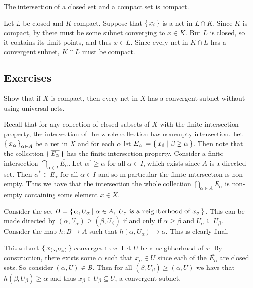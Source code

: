 \documentclass[letterpaper, 11pt, oneside]{book}
\begin{document}
\begin{prop}\label{prop: closed_cap_compact_is_compact}
  The intersection of a closed set and a compact set is compact.
\end{prop}
\begin{pf}
  Let $L$ be closed and $K$ compact.
  Suppose that $\set{x_{i}}$ is a net in $L \cap K$.
  Since $K$ is compact, by  there must be some subnet converging to $x \in K$.
  But $L$ is closed, so it contains its limit points, and thus $x \in L$.
  Since every net in $K \cap L$ has a convergent subnet, $K \cap L$ must be compact.
\end{pf}

\clearpage

\subsection*{Exercises}

\begin{exercise}
  Show that if $X$ is compact, then every net in $X$ has a convergent subnet without using universal nets.
\end{exercise}
\begin{pf}
  Recall that for any collection of closed subsets of $X$ with the finite intersection property, the intersection of the whole collection has nonempty intersection.
  Let $\set{x_{\alpha}}_{\alpha \in A}$ be a net in $X$ and for each $\alpha$ let $E_{\alpha} \coloneqq \set{x_{\beta} | \beta \geq \alpha}$.
  Then note that the collection $\set{\overline{E_{\alpha}}}$ has the finite intersection property.
  Consider a finite intersection $\bigcap_{\alpha \in I} \overline{E_{\alpha}}$.
  Let $\alpha^{*} \geq \alpha$ for all $\alpha \in I$, which exists since $A$ is a directed set.
  Then $\alpha^{*} \in \overline{E_{\alpha}}$ for all $\alpha \in I$ and so in particular the finite intersection is non-empty.
  Thus we have that the intersection the whole collection $\bigcap_{\alpha \in A} \overline{E_{\alpha}}$ is non-empty containing some element $x \in X$.

  Consider the set $B = \set{\alpha, U_{\alpha} | \alpha \in A,~ U_{\alpha} \text{ is a neighborhood of } x_{\alpha}}$.
  This can be made directed by $(\alpha, U_{\alpha}) \geq (\beta, U_{\beta})$ if and only if $\alpha \geq \beta$ and $U_{\alpha} \subseteq U_{\beta}$.
  Consider the map $h\colon B \to A$ such that $h(\alpha, U_{\alpha}) \to \alpha$.
  This is clearly final.

  This subnet $\set{x_{(\alpha, U_{\alpha})}}$ converges to $x$.
  Let $U$ be a neighborhood of $x$.
  By construction, there exists some $\alpha$ such that $x_{\alpha} \in U$ since each of the $\overline{E_{\alpha}}$ are closed sets.
  So consider $(\alpha, U) \in B$.
  Then for all $(\beta, U_{\beta}) \geq (\alpha, U)$ we have that $h(\beta, U_{\beta}) \geq \alpha$ and thus $x_{\beta} \in U_{\beta} \subseteq U$, a convergent subnet.
\end{pf}
\end{document}
